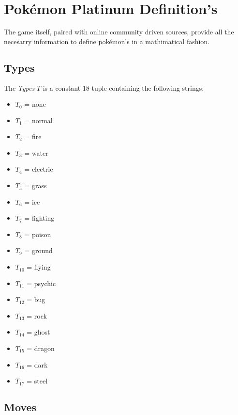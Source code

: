 \section{Pokémon Platinum Definition's}

The game itself, paired with online community driven sources, provide all the necesarry information to define pokémon's in a mathimatical fashion.

\subsection{Types}


The \emph{Types} $T$ is a constant 18-tuple containing the following strings:
\begin{itemize}
    \item $T_0$  = none
    \item $T_1$  = normal
    \item $T_2$  = fire
    \item $T_3$  = water
    \item $T_4$  = electric
    \item $T_5$  = grass
    \item $T_6$  = ice
    \item $T_7$  = fighting
    \item $T_8$  = poison
    \item $T_9$  = ground
    \item $T_{10}$ = flying
    \item $T_{11}$ = psychic
    \item $T_{12}$ = bug
    \item $T_{13}$ = rock
    \item $T_{14}$ = ghost
    \item $T_{15}$ = dragon
    \item $T_{16}$ = dark
    \item $T_{17}$ = steel
\end{itemize}

\subsection{Moves}

